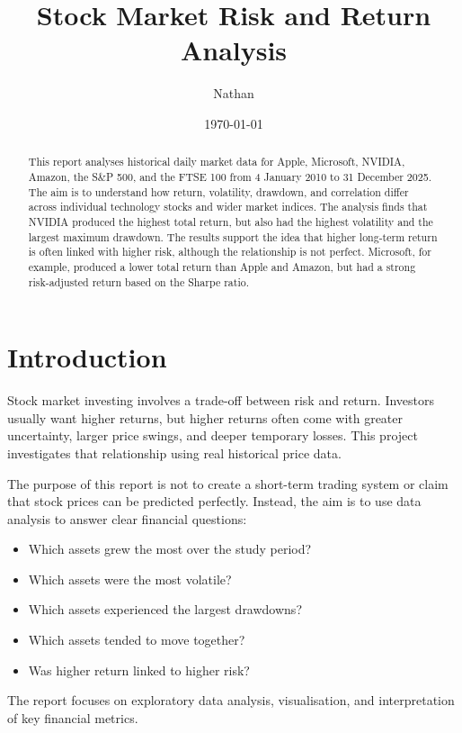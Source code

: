 \documentclass[12pt,a4paper]{article}
\title{Stock Market Risk and Return Analysis}
\author{Nathan}
\date{\today}
\begin{document}
\maketitle

\begin{abstract}
This report analyses historical daily market data for Apple, Microsoft, NVIDIA, Amazon, the S\&P 500, and the FTSE 100 from 4 January 2010 to 31 December 2025. The aim is to understand how return, volatility, drawdown, and correlation differ across individual technology stocks and wider market indices. The analysis finds that NVIDIA produced the highest total return, but also had the highest volatility and the largest maximum drawdown. The results support the idea that higher long-term return is often linked with higher risk, although the relationship is not perfect. Microsoft, for example, produced a lower total return than Apple and Amazon, but had a strong risk-adjusted return based on the Sharpe ratio.
\end{abstract}

\section{Introduction}

Stock market investing involves a trade-off between risk and return. Investors usually want higher returns, but higher returns often come with greater uncertainty, larger price swings, and deeper temporary losses. This project investigates that relationship using real historical price data.

The purpose of this report is not to create a short-term trading system or claim that stock prices can be predicted perfectly. Instead, the aim is to use data analysis to answer clear financial questions:

\begin{itemize}
    \item Which assets grew the most over the study period?
    \item Which assets were the most volatile?
    \item Which assets experienced the largest drawdowns?
    \item Which assets tended to move together?
    \item Was higher return linked to higher risk?
\end{itemize}

The report focuses on exploratory data analysis, visualisation, and interpretation of key financial metrics.
\end{document}
